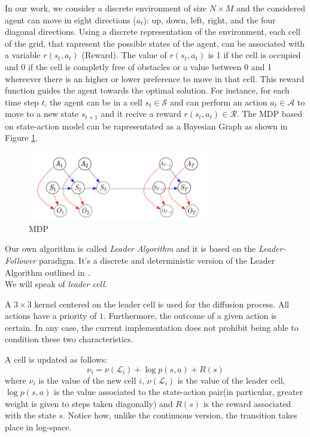 \documentclass[journal,article,submit,pdftex,moreauthors]{Definitions/mdpi}
\begin{document}
In our work, we consider a discrete environment of size $N\times M$ and the considered agent can move in eight directions ($a_t$): up, down, left, right, and the four diagonal directions.
Using a discrete representation of the environment, each cell of the grid, that rapresent the possible states of the agent, can be associated with a variable $r(s_t, a_t)$ (Reward).
 The value of $r(s_t, a_t)$ is 1 if the cell is occupied and 0 if the cell is completly free of obstacles or 
a value between 0 and 1 whereever there is an higher or lower preference to move in that cell. This reward function guides the agent towards the optimal solution. 
For instance, for each time step $t$, the agent can be in a cell $s_t\in \mathcal{S}$ and can perform an action $a_t \in \mathcal{A}$ to move to a new state $s_{t+1}$ and it recive a reward 
$r(s_t, a_t) \in \mathcal{R}$.
The MDP based on state-action model can be rapresentated as a Bayesian Graph as shown in Figure \ref{fig:MDP}.

\begin{figure}
	\centering
	\includegraphics[width=0.7\textwidth]{res/imgs/Mdp.png}
	\caption{MDP}
	\label{fig:MDP}
\end{figure}



Our own algorithm is called \textit{Leader Algorithm} and it is based on the \textit{Leader-Follower} paradigm. It's a discrete and deterministic version of the Leader Algorithm outlined 
in \cite{}.\\
 
We will speak  of \textit {leader cell}. 

A $3 \times 3$ kernel centered on the leader cell is used for the diffusion process. All actions have a priority of $1$. 
Furthermore, the outcome of a given action is certain. In any case, the current implementation does not prohibit being able to condition these two characteristics.

A cell is updated as follows:
\begin{equation*}\label{eq:weight_update_disc}
    \nu_i = \nu(\mathcal{L}_i) + \log p(s,a) + R(s)
\end{equation*}
where $\nu_i$ is the value  of the new cell $i$, $\nu(\mathcal{L}_i)$ is the value of the leader cell, $\log p(s,a)$ is the value associated to the state-action pair(in particular, greater weight is given to steps taken diagonally) and $R(s)$ is the reward associated with the state $s$. Notice how, unlike the continuous version, the transition takes place in log-space.
\end{document}
